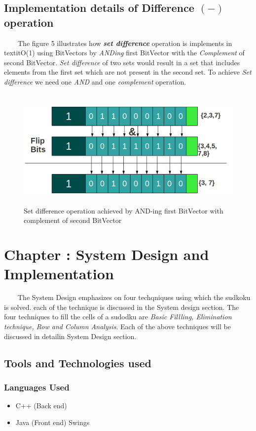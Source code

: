 \documentclass[12pt,a4paper]{article}
\begin{document}
\subsection{Implementation details of Difference $(-)$operation}
\ \ \ \ The figure 5 illustrates how \textit{\textbf{set difference}} operation is implements in textit{O(1)} using BitVectors by \textit{ANDing} first BitVector with the \textit{Complement} of second BitVector. \textit{Set difference} of two sets would result in a set that includes elements from the first set which are not present in the second set. To achieve \textit{Set difference} we need one \textit{AND} and one \textit{complement} operation. 
\begin{figure}[H]
\begin{center}
\ \newline
\includegraphics[height=50mm, scale=.5]{difference.png}
\caption{Set difference operation achieved by AND-ing first BitVector with complement of second BitVector}
\end{center}
\end{figure}


\section{Chapter : System Design and Implementation}
\ \ \ \ The System Design emphasizes on four techqniques using which the sudkoku is solved. each of the technique is discussed in the System design section. The four techniques to fill the cells of a sudodku are \textit{Basic Fillling, Elimination technique, Row and Column Analysis}. Each of the above techniques will be discussed in detailin System Design section. 

\subsection{Tools and Technologies used}
\subsubsection{Languages Used}
\begin{itemize}
\item{ C++ (Back end)}
\item{ Java (Front end) Swings}
\end{itemize}
\end{document}
